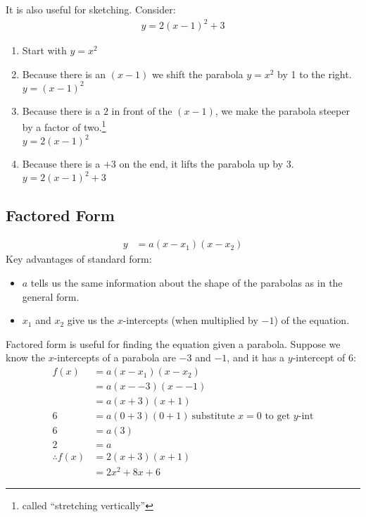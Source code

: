 It is also useful for sketching. Consider:
\begin{align}
  y = 2(x-1)^{2} + 3
\end{align}
\begin{enumerate}
  \item Start with $y = x^2$
  
  \item Because there is an $(x - 1)$ we shift the parabola $y = x^2$ by 1 to
  the right.\\
  $y = (x - 1)^2$
  
  \item Because there is a $2$ in front of the $(x-1)$, we make the parabola
  steeper by a factor of two.\footnote{called ``stretching vertically''} \\
  $y = 2(x - 1)^2$
  
  \item Because there is a $+3$ on the end, it lifts the parabola up by 3. \\
  $y = 2(x - 1)^2 +3$
\end{enumerate}

\subsection{Factored Form}
\begin{align}
  y & = a(x - x_1)(x - x_2) \nonumber
\end{align}
Key advantages of standard form:
\begin{itemize}
  \item $a$ tells us the same information about the shape of the parabolas as in
  the general form.
  \item $x_1$ and $x_2$ give us the $x$-intercepts (when multiplied by $-1$) of
  the equation.
\end{itemize}
Factored form is useful for finding the equation given a parabola. Suppose we
know the $x$-intercepts of a parabola are $-3$ and $-1$, and it has a
$y$-intercept of 6:
\begin{align}
  f(x) & = a(x - x_1)(x - x_2) \\
       & = a(x - -3)(x - -1) \\
       & = a(x +3)(x + 1) \\
     6 & = a(0 + 3)(0 + 1)~\text{substitute $x=0$ to get $y$-int} \\
     6 & = a(3) \\
     2 & = a \\
     \therefore f(x) & = 2(x+3)(x+1) \\
     & = 2x^2 + 8x + 6 
\end{align}

